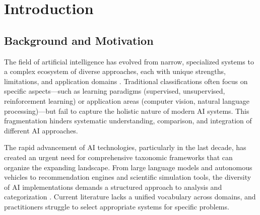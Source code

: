 \documentclass[acmsmall,screen,review]{acmart}
\begin{document}



\maketitle

\section{Introduction}

\subsection{Background and Motivation}
The field of artificial intelligence has evolved from narrow, specialized systems to a complex ecosystem of diverse approaches, each with unique strengths, limitations, and application domains \cite{arrieta2020explainable, jordan2015machine, russell2021artificial}. Traditional classifications often focus on specific aspects---such as learning paradigms (supervised, unsupervised, reinforcement learning) \cite{bengio2013representation, lecun2015deep} or application areas (computer vision, natural language processing)---but fail to capture the holistic nature of modern AI systems. This fragmentation hinders systematic understanding, comparison, and integration of different AI approaches.

The rapid advancement of AI technologies, particularly in the last decade, has created an urgent need for comprehensive taxonomic frameworks that can organize the expanding landscape. From large language models \cite{bommasani2021opportunities, brown2020language} and autonomous vehicles to recommendation engines and scientific simulation tools, the diversity of AI implementations demands a structured approach to analysis and categorization \cite{goodfellow2016deep}. Current literature lacks a unified vocabulary across domains, and practitioners struggle to select appropriate systems for specific problems.
\end{document}

